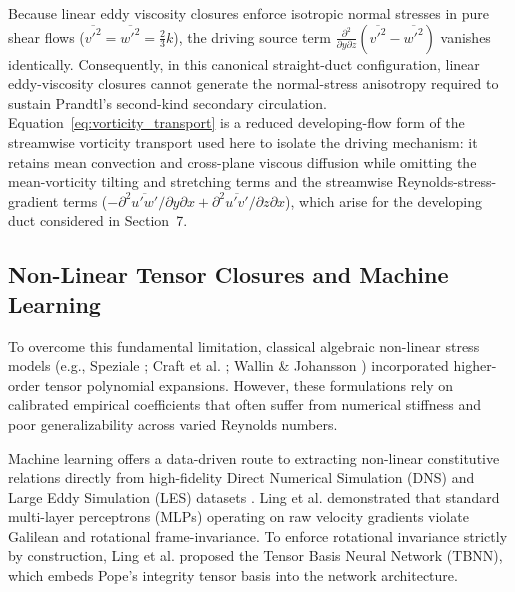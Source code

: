 \documentclass[11pt,a4paper]{article}
\begin{document}
Because linear eddy viscosity closures enforce isotropic normal stresses in pure shear flows ($\overline{{v'}^2} = \overline{{w'}^2} = \frac{2}{3}k$), the driving source term $\frac{\partial^2}{\partial y \partial z}(\overline{{v'}^2} - \overline{{w'}^2})$ vanishes identically. Consequently, in this canonical straight-duct configuration, linear eddy-viscosity closures cannot generate the normal-stress anisotropy required to sustain Prandtl's second-kind secondary circulation. Equation~\eqref{eq:vorticity_transport} is a reduced developing-flow form of the streamwise vorticity transport used here to isolate the driving mechanism: it retains mean convection and cross-plane viscous diffusion while omitting the mean-vorticity tilting and stretching terms and the streamwise Reynolds-stress-gradient terms ($-\partial^2\overline{u'w'}/\partial y \partial x + \partial^2\overline{u'v'}/\partial z \partial x$), which arise for the developing duct considered in Section~7.

\subsection{Non-Linear Tensor Closures and Machine Learning}
To overcome this fundamental limitation, classical algebraic non-linear stress models (e.g., Speziale \cite{speziale1991analytical}; Craft et al. \cite{craft1996development}; Wallin \& Johansson \cite{wallin2000explicit}) incorporated higher-order tensor polynomial expansions. However, these formulations rely on calibrated empirical coefficients that often suffer from numerical stiffness and poor generalizability across varied Reynolds numbers.

Machine learning offers a data-driven route to extracting non-linear constitutive relations directly from high-fidelity Direct Numerical Simulation (DNS) and Large Eddy Simulation (LES) datasets \cite{vinuesa2014aspect, pirozzoli2018turbulence}. Ling et al. \cite{ling2016reynolds} demonstrated that standard multi-layer perceptrons (MLPs) operating on raw velocity gradients violate Galilean and rotational frame-invariance. To enforce rotational invariance strictly by construction, Ling et al. proposed the Tensor Basis Neural Network (TBNN), which embeds Pope's \cite{pope1975more} integrity tensor basis into the network architecture.
\end{document}
